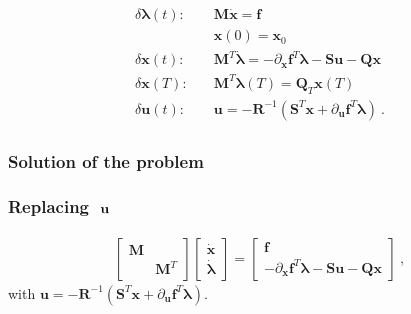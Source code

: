 \documentclass[letterpaper,10pt,english]{jupyterBook}
\begin{document}
\begin{equation}\label{equation:ch/control/optimal-control-full-state-old:eq:optimal:ode}
\begin{split}\begin{aligned}
 \delta \boldsymbol\lambda(t): & \quad \mathbf{M}   \dot{\mathbf{x}} = \mathbf{f} \\
                               & \quad \mathbf{x}(0) = \mathbf{x}_0 \\
 \delta \mathbf{x}(t)        : & \quad \mathbf{M}^T \dot{\boldsymbol{\lambda}} = -\partial_{\mathbf{x}} \mathbf{f}^T \boldsymbol\lambda - \mathbf{S} \mathbf{u} - \mathbf{Q} \mathbf{x} \\
 \delta \mathbf{x}(T)        : & \quad \mathbf{M}^T \boldsymbol\lambda(T) = \mathbf{Q}_T \mathbf{x}(T) \\
 \delta \mathbf{u}(t)        : & \quad \mathbf{u} = - \mathbf{R}^{-1} \left( \mathbf{S}^T \mathbf{x} + \partial_\mathbf{u} \mathbf{f}^T \boldsymbol\lambda \right) \ .
\end{aligned}\end{split}
\end{equation}\subsubsection*{Solution of the problem}
\subsubsection*{Replacing \protect\(\ \mathbf{u}\protect\)}
\begin{equation*}
\begin{split}\begin{bmatrix} \mathbf{M} & \\ & \mathbf{M}^T \end{bmatrix} \begin{bmatrix} \dot{\mathbf{x}} \\ \dot{\boldsymbol{\lambda}} \end{bmatrix} = \begin{bmatrix} \mathbf{f} \\ - \partial_{\mathbf{x}} \mathbf{f}^T \boldsymbol\lambda - \mathbf{S} \mathbf{u} - \mathbf{Q} \mathbf{x} \end{bmatrix} \ ,\end{split}
\end{equation*}
\sphinxAtStartPar
with \(\mathbf{u} = - \mathbf{R}^{-1} \left( \mathbf{S}^T \mathbf{x} + \partial_\mathbf{u} \mathbf{f}^T \boldsymbol\lambda \right)\).
\end{document}
